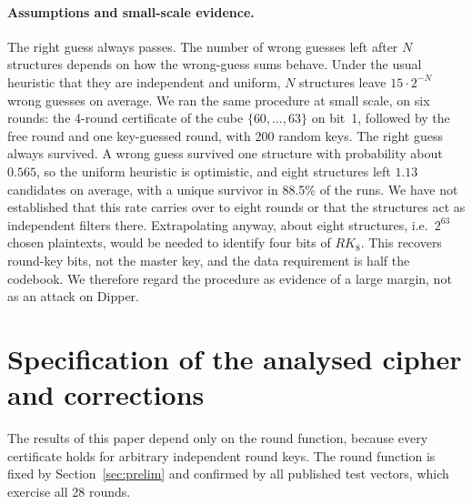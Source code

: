 \documentclass[11pt,a4paper]{article}
\theoremstyle{definition}
\theoremstyle{remark}
\begin{document}
\paragraph{Assumptions and small-scale evidence.} The right guess always passes. The number of wrong guesses left after $N$ structures depends on how the wrong-guess sums behave. Under the usual heuristic that they are independent and uniform, $N$ structures leave $15\cdot2^{-N}$ wrong guesses on average. We ran the same procedure at small scale, on six rounds: the 4-round certificate of the cube $\{60,\dots,63\}$ on bit~1, followed by the free round and one key-guessed round, with 200 random keys. The right guess always survived. A wrong guess survived one structure with probability about $0.565$, so the uniform heuristic is optimistic, and eight structures left $1.13$ candidates on average, with a unique survivor in 88.5\% of the runs. We have not established that this rate carries over to eight rounds or that the structures act as independent filters there. Extrapolating anyway, about eight structures, i.e.\ $2^{63}$ chosen plaintexts, would be needed to identify four bits of $RK_8$. This recovers round-key bits, not the master key, and the data requirement is half the codebook. We therefore regard the procedure as evidence of a large margin, not as an attack on Dipper.

\section{Specification of the analysed cipher and corrections}\label{sec:erratum}
The results of this paper depend only on the round function, because every certificate holds for arbitrary independent round keys. The round function is fixed by Section~\ref{sec:prelim} and confirmed by all published test vectors, which exercise all 28 rounds.
\end{document}
